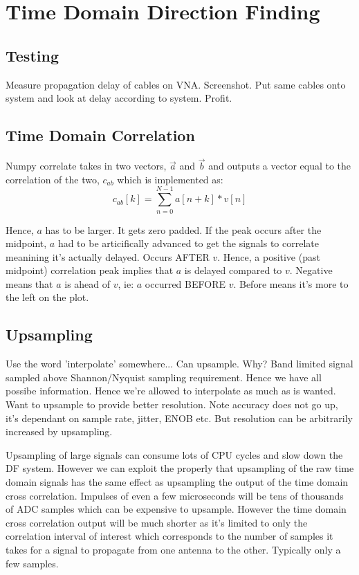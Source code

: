 \section{Time Domain Direction Finding}

\subsection{Testing}
Measure propagation delay of cables on VNA. Screenshot.
Put same cables onto system and look at delay according to system. 
Profit.

\subsection{Time Domain Correlation}
Numpy correlate takes in two vectors, \(\vec{a}\) and \(\vec{b}\) and outputs a vector equal to the correlation of the two, \(c_{ab}\) which is implemented as:
\begin{equation}
  c_{ab}[k] = \sum_{n = 0}^{N-1} a[n+k] * v[n]
\end{equation}

Hence, \(a\) has to be larger. It gets zero padded. 
If the peak occurs after the midpoint, \(a\) had to be articifically advanced to get the signals to correlate meanining it's actually delayed. Occurs AFTER \(v\). 
Hence, a positive (past midpoint) correlation peak implies that \(a\) is delayed compared to \(v\). Negative means that \(a\) is ahead of \(v\), ie: \(a\) occurred BEFORE \(v\). Before means it's more to the left on the plot.


\subsection{Upsampling}
Use the word 'interpolate' somewhere...
Can upsample. Why? Band limited signal sampled above Shannon/Nyquist sampling requirement. Hence we have all possibe information. Hence we're allowed to interpolate as much as is wanted. 
Want to upsample to provide better resolution. Note accuracy does not go up, it's dependant on sample rate, jitter, ENOB etc. But resolution can be arbitrarily increased by upsampling.

Upsampling of large signals can consume lots of CPU cycles and slow down the DF system. However we can exploit the properly that upsampling of the raw time domain signals has the same effect as upsampling the output of the time domain cross correlation. Impulses of even a few microseconds will be tens of thousands of ADC samples which can be expensive to upsample. However the time domain cross correlation output will be much shorter as it's limited to only the correlation interval of interest which corresponds to the number of samples it takes for a signal to propagate from one antenna to the other. Typically only a few samples.

